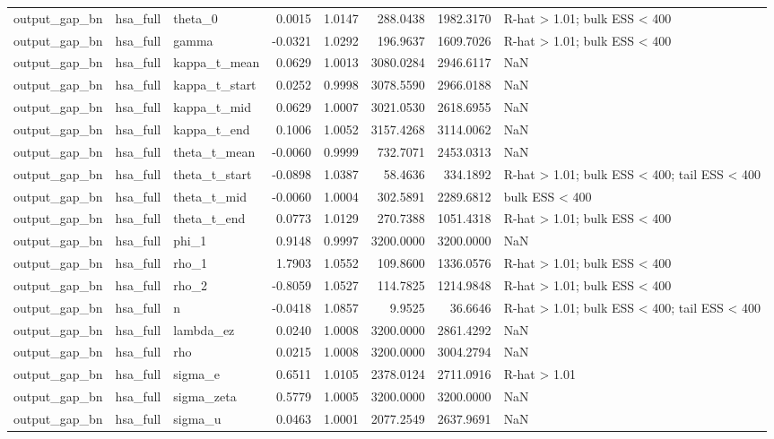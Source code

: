 \begin{tabular}{lllrrrrl}
output\_gap\_bn & hsa\_full & theta\_0 & 0.0015 & 1.0147 & 288.0438 & 1982.3170 & R-hat > 1.01; bulk ESS < 400 \\
output\_gap\_bn & hsa\_full & gamma & -0.0321 & 1.0292 & 196.9637 & 1609.7026 & R-hat > 1.01; bulk ESS < 400 \\
output\_gap\_bn & hsa\_full & kappa\_t\_mean & 0.0629 & 1.0013 & 3080.0284 & 2946.6117 & NaN \\
output\_gap\_bn & hsa\_full & kappa\_t\_start & 0.0252 & 0.9998 & 3078.5590 & 2966.0188 & NaN \\
output\_gap\_bn & hsa\_full & kappa\_t\_mid & 0.0629 & 1.0007 & 3021.0530 & 2618.6955 & NaN \\
output\_gap\_bn & hsa\_full & kappa\_t\_end & 0.1006 & 1.0052 & 3157.4268 & 3114.0062 & NaN \\
output\_gap\_bn & hsa\_full & theta\_t\_mean & -0.0060 & 0.9999 & 732.7071 & 2453.0313 & NaN \\
output\_gap\_bn & hsa\_full & theta\_t\_start & -0.0898 & 1.0387 & 58.4636 & 334.1892 & R-hat > 1.01; bulk ESS < 400; tail ESS < 400 \\
output\_gap\_bn & hsa\_full & theta\_t\_mid & -0.0060 & 1.0004 & 302.5891 & 2289.6812 & bulk ESS < 400 \\
output\_gap\_bn & hsa\_full & theta\_t\_end & 0.0773 & 1.0129 & 270.7388 & 1051.4318 & R-hat > 1.01; bulk ESS < 400 \\
output\_gap\_bn & hsa\_full & phi\_1 & 0.9148 & 0.9997 & 3200.0000 & 3200.0000 & NaN \\
output\_gap\_bn & hsa\_full & rho\_1 & 1.7903 & 1.0552 & 109.8600 & 1336.0576 & R-hat > 1.01; bulk ESS < 400 \\
output\_gap\_bn & hsa\_full & rho\_2 & -0.8059 & 1.0527 & 114.7825 & 1214.9848 & R-hat > 1.01; bulk ESS < 400 \\
output\_gap\_bn & hsa\_full & n & -0.0418 & 1.0857 & 9.9525 & 36.6646 & R-hat > 1.01; bulk ESS < 400; tail ESS < 400 \\
output\_gap\_bn & hsa\_full & lambda\_ez & 0.0240 & 1.0008 & 3200.0000 & 2861.4292 & NaN \\
output\_gap\_bn & hsa\_full & rho & 0.0215 & 1.0008 & 3200.0000 & 3004.2794 & NaN \\
output\_gap\_bn & hsa\_full & sigma\_e & 0.6511 & 1.0105 & 2378.0124 & 2711.0916 & R-hat > 1.01 \\
output\_gap\_bn & hsa\_full & sigma\_zeta & 0.5779 & 1.0005 & 3200.0000 & 3200.0000 & NaN \\
output\_gap\_bn & hsa\_full & sigma\_u & 0.0463 & 1.0001 & 2077.2549 & 2637.9691 & NaN \\

\end{tabular}
